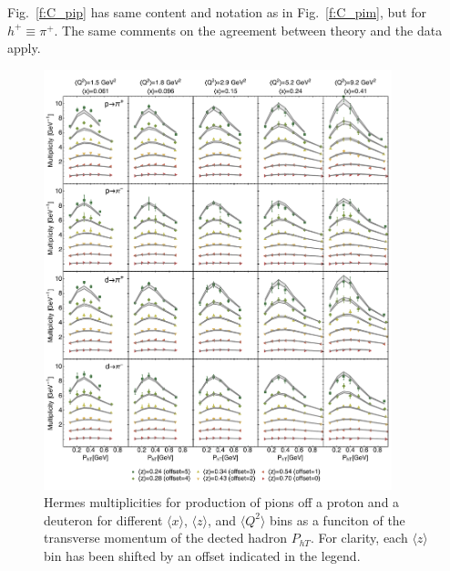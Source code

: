 \documentclass[aps,preprintnumbers,showpacs,nofootinbib,superscriptaddress,floatfix]{revtex4}
\begin{document}
Fig.~\ref{f:C_pip} has same content and notation as in Fig.~\ref{f:C_pim}, but
for $h^+ \equiv \pi^+$. The same comments on the agreement between theory and
the data apply. 
\begin{figure}[h!]
\begin{center}
\includegraphics[width=0.90\textwidth]{plots/Hermes_Pions_SCIplot_flINDEP.pdf}
\end{center}
\caption{Hermes multiplicities for production of pions off a proton and a deuteron for different $\langle x \rangle$, $\langle z \rangle$, and $\langle Q^2 \rangle$ bins as a funciton of the transverse momentum of the dected hadron  $P_{hT}$. For clarity, each $\langle z \rangle$  bin has been shifted by an offset indicated in the legend.} 
\label{f:H_pions}
\end{figure}
\end{document}
